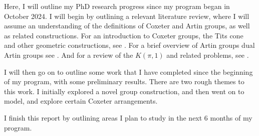 Here, I will outline my PhD research progress since my program began in October 2024.
I will begin by outlining a relevant literature review, where I will assume an understanding of the definitions of Coxeter and Artin groups, as well as related constructions.
For an introduction to Coxeter groups, the Tits cone and other geometric constructions, see \cite{humphreys_reflection_1990}.
For a brief overview of Artin groups dual Artin groups see \cite[Sections 1,2]{paolini_salvetti_kpi1_2021}.
And for a review of the $K(\pi,1)$ and related problems, see \cite{paris_kpi1_2014}.

I will then go on to outline some work that I have completed since the beginning of my program, with some preliminary results.
There are two rough themes to this work.
I initially explored a novel group construction, and then went on to model, and explore certain Coxeter arrangements.

I finish this report by outlining areas I plan to study in the next 6 months of my program.
